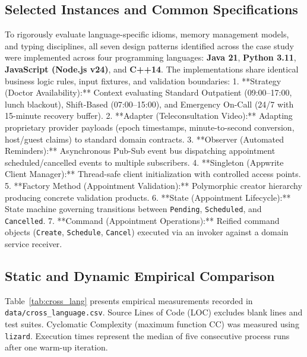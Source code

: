 \documentclass[11pt,a4paper]{article}
\begin{document}
\subsection{Selected Instances and Common Specifications}
To rigorously evaluate language-specific idioms, memory management models, and typing disciplines, all seven design patterns identified across the case study were implemented across four programming languages: \textbf{Java 21}, \textbf{Python 3.11}, \textbf{JavaScript (Node.js v24)}, and \textbf{C++14}. The implementations share identical business logic rules, input fixtures, and validation boundaries:
1. **Strategy (Doctor Availability):** Context evaluating Standard Outpatient (09:00--17:00, lunch blackout), Shift-Based (07:00--15:00), and Emergency On-Call (24/7 with 15-minute recovery buffer).
2. **Adapter (Teleconsultation Video):** Adapting proprietary provider payloads (epoch timestamps, minute-to-second conversion, host/guest claims) to standard domain contracts.
3. **Observer (Automated Reminders):** Asynchronous Pub-Sub event bus dispatching appointment scheduled/cancelled events to multiple subscribers.
4. **Singleton (Appwrite Client Manager):** Thread-safe client initialization with controlled access points.
5. **Factory Method (Appointment Validation):** Polymorphic creator hierarchy producing concrete validation products.
6. **State (Appointment Lifecycle):** State machine governing transitions between \texttt{Pending}, \texttt{Scheduled}, and \texttt{Cancelled}.
7. **Command (Appointment Operations):** Reified command objects (\texttt{Create}, \texttt{Schedule}, \texttt{Cancel}) executed via an invoker against a domain service receiver.

\subsection{Static and Dynamic Empirical Comparison}

Table~\ref{tab:cross_lang} presents empirical measurements recorded in \texttt{data/cross\_language.csv}. Source Lines of Code (LOC) excludes blank lines and test suites. Cyclomatic Complexity (maximum function CC) was measured using \texttt{lizard}. Execution times represent the median of five consecutive process runs after one warm-up iteration.
\end{document}
